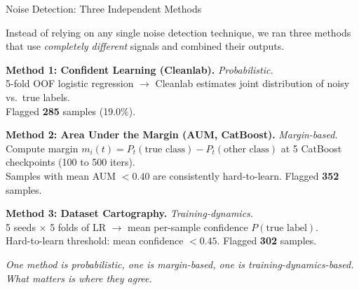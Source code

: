 \documentclass[aspectratio=169, 11pt]{beamer}
\begin{document}
\begin{frame}{Noise Detection: Three Independent Methods}

Instead of relying on any single noise detection technique, we ran three methods that use \textit{completely different} signals and combined their outputs.

\vspace{0.5em}
\textbf{Method 1: Confident Learning (Cleanlab).} \textit{Probabilistic.}\\
5-fold OOF logistic regression $\to$ Cleanlab estimates joint distribution of noisy vs.\ true labels.\\
Flagged \textbf{285} samples (19.0\%).

\vspace{0.4em}
\textbf{Method 2: Area Under the Margin (AUM, CatBoost).} \textit{Margin-based.}\\
Compute margin $m_i(t) = P_t(\text{true class}) - P_t(\text{other class})$ at 5 CatBoost checkpoints (100 to 500 iters).\\
Samples with mean AUM $< 0.40$ are consistently hard-to-learn. Flagged \textbf{352} samples.

\vspace{0.4em}
\textbf{Method 3: Dataset Cartography.} \textit{Training-dynamics.}\\
5 seeds $\times$ 5 folds of LR $\to$ mean per-sample confidence $P(\text{true label})$.\\
Hard-to-learn threshold: mean confidence $< 0.45$. Flagged \textbf{302} samples.

\vspace{0.4em}
\textit{One method is probabilistic, one is margin-based, one is training-dynamics-based.\\What matters is where they agree.}
\end{frame}
\end{document}
